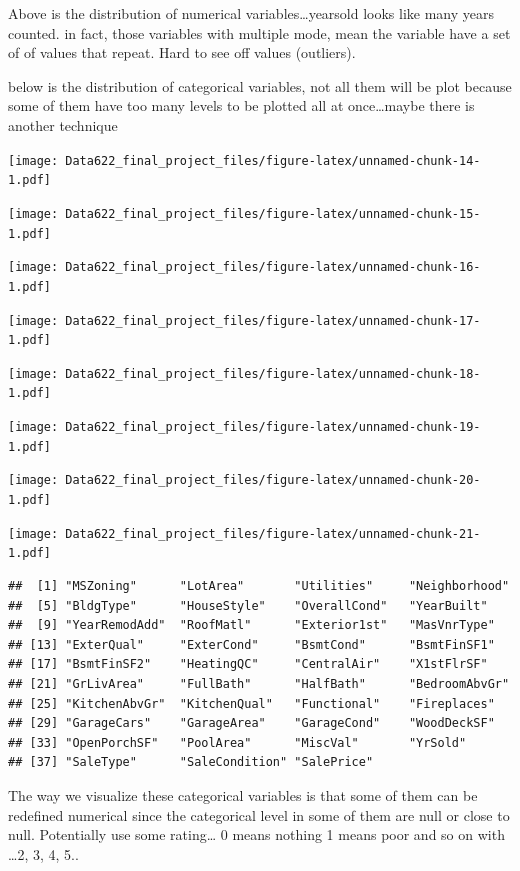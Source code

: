 \documentclass[
]{article}
\begin{document}
Above is the distribution of numerical variables\ldots yearsold looks
like many years counted. in fact, those variables with multiple mode,
mean the variable have a set of of values that repeat. Hard to see off
values (outliers).

below is the distribution of categorical variables, not all them will be
plot because some of them have too many levels to be plotted all at
once\ldots maybe there is another technique

\texttt{[image: Data622\_final\_project\_files/figure-latex/unnamed-chunk-14-1.pdf]}

\texttt{[image: Data622\_final\_project\_files/figure-latex/unnamed-chunk-15-1.pdf]}

\texttt{[image: Data622\_final\_project\_files/figure-latex/unnamed-chunk-16-1.pdf]}

\texttt{[image: Data622\_final\_project\_files/figure-latex/unnamed-chunk-17-1.pdf]}

\texttt{[image: Data622\_final\_project\_files/figure-latex/unnamed-chunk-18-1.pdf]}

\texttt{[image: Data622\_final\_project\_files/figure-latex/unnamed-chunk-19-1.pdf]}

\texttt{[image: Data622\_final\_project\_files/figure-latex/unnamed-chunk-20-1.pdf]}

\texttt{[image: Data622\_final\_project\_files/figure-latex/unnamed-chunk-21-1.pdf]}

\begin{verbatim}
##  [1] "MSZoning"      "LotArea"       "Utilities"     "Neighborhood" 
##  [5] "BldgType"      "HouseStyle"    "OverallCond"   "YearBuilt"    
##  [9] "YearRemodAdd"  "RoofMatl"      "Exterior1st"   "MasVnrType"   
## [13] "ExterQual"     "ExterCond"     "BsmtCond"      "BsmtFinSF1"   
## [17] "BsmtFinSF2"    "HeatingQC"     "CentralAir"    "X1stFlrSF"    
## [21] "GrLivArea"     "FullBath"      "HalfBath"      "BedroomAbvGr" 
## [25] "KitchenAbvGr"  "KitchenQual"   "Functional"    "Fireplaces"   
## [29] "GarageCars"    "GarageArea"    "GarageCond"    "WoodDeckSF"   
## [33] "OpenPorchSF"   "PoolArea"      "MiscVal"       "YrSold"       
## [37] "SaleType"      "SaleCondition" "SalePrice"
\end{verbatim}

The way we visualize these categorical variables is that some of them
can be redefined numerical since the categorical level in some of them
are null or close to null. Potentially use some rating\ldots{} 0 means
nothing 1 means poor and so on with \ldots2, 3, 4, 5..
\end{document}
